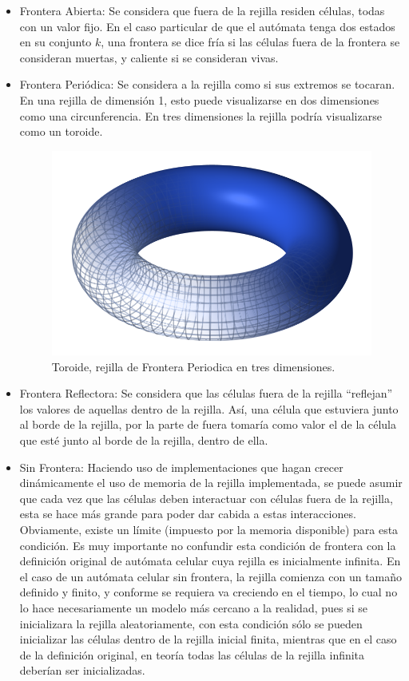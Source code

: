 \begin{itemize}
\item Frontera Abierta: Se considera que fuera de la rejilla residen células, todas con un valor fijo. En el caso particular de que el autómata tenga dos estados en su conjunto $k$, una frontera se dice fría si las células fuera de la frontera se consideran muertas, y caliente si se consideran vivas.
\item Frontera Periódica: Se considera a la rejilla como si sus extremos se tocaran. En una rejilla de dimensión 1, esto puede visualizarse en dos dimensiones como una circunferencia. En tres dimensiones la rejilla podría visualizarse como un toroide.

\begin{figure}[H]
\centering
\includegraphics[scale=0.25]{imagenes/Torus.png}
\caption{Toroide, rejilla de Frontera Periodica en tres dimensiones.}
\label{fig:torus}
\end{figure}

\item Frontera Reflectora:  Se considera que las células fuera de la rejilla ``reflejan'' los valores de aquellas dentro de la rejilla. Así, una célula que estuviera junto al borde de la rejilla, por la parte de fuera tomaría como valor el de la célula que esté junto al borde de la rejilla, dentro de ella. 

 \item Sin Frontera: Haciendo uso de implementaciones que hagan crecer dinámicamente el uso de memoria de la rejilla implementada, se puede asumir que cada vez que las células deben interactuar con células fuera de la rejilla, esta se hace más grande para poder dar cabida a estas interacciones. Obviamente, existe un límite (impuesto por la memoria disponible) para esta condición. Es muy importante no confundir esta condición de frontera con la definición original de autómata celular cuya rejilla es inicialmente infinita. En el caso de un autómata celular sin frontera, la rejilla comienza con un tamaño definido y finito, y conforme se requiera va creciendo en el tiempo, lo cual no lo hace necesariamente un modelo más cercano a la realidad, pues si se inicializara la rejilla aleatoriamente, con esta condición sólo se pueden inicializar las células dentro de la rejilla inicial finita, mientras que en el caso de la definición original, en teoría todas las células de la rejilla infinita deberían ser inicializadas.
\end{itemize}


